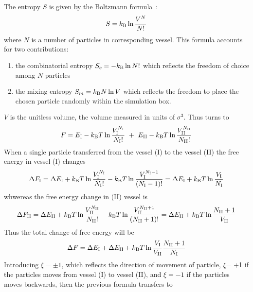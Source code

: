 \documentclass{elsarticle}
\begin{document}
The entropy $S$ is given by the Boltzmann formula~\cite{Nagle2004}:
\begin{equation}
    S=k_\mathrm{B}\ln\frac{V^{N}}{N!}\label{eq:entropy}
\end{equation}
where $N$ is a number of particles in corresponding vessel.
This formula accounts for two contributions:
\begin{enumerate}
    \item the combinatorial entropy $S_{c}=-k_\mathrm{B}\ln N!$ which reflects the freedom of choice among $N$ particles
    \item the mixing entropy $S_{m}=k_\mathrm{B} N\ln V$ which reflects the freedom to place the chosen particle randomly within the simulation box. 
\end{enumerate}
$V$ is the unitless volume, \ie the volume measured in units of $\sigma^3$. 
Thus  turns to 
\begin{equation}
    F=\EI-\kT\ln\frac{\VI^{\NI}}{\NI!}\ + \ \EII-\kT\ln\frac{\VII ^{\NII}}{{\NII} !}
\label{eq: F_gibbs}
\end{equation}
When a single particle transferred from the vessel (I) to the  vessel (II) the free energy in vessel (I) changes 
\begin{equation}
\Delta F_{\mathrm{I}} = \Delta E_{\mathrm{I}}+k_\mathrm{B}T\ln\frac{V_{\mathrm{I}}^{N_{\mathrm{I}}}}{N_{\mathrm{I}} !} - k_\mathrm{B}T\ln\frac{V_{\mathrm{I}}^{N_{\mathrm{I}}-1}}{(N_{\mathrm{I}}-1)!}=\Delta E_{\mathrm{I}} + k_\mathrm{B}T\ln\frac{V_{\mathrm{I}}}{N_{\mathrm{I}}}
\end{equation}
whwereas the free energy change in (II) vessel is
\begin{equation}
\Delta F_{\mathrm{II}} = \Delta E_{\mathrm{II}}+k_\mathrm{B}T\ln\frac{V_{\mathrm{II}}^{N_{\mathrm{II}}}}{N_{\mathrm{II}} !} - k_\mathrm{B}T\ln\frac{V_{\mathrm{II}}^{N_{\mathrm{II}}+1}}{(N_{\mathrm{II}}+1)!}=\Delta E_{\mathrm{II}} + k_\mathrm{B}T\ln\frac{N_{\mathrm{II}}+1}{V_{\mathrm{II}}}
\end{equation}
Thus the total change of free energy will be 
\begin{equation}
\Delta F = \Delta E_{\mathrm{I}}+\Delta E_{\mathrm{II}}+k_\mathrm{B}T\ln\frac{V_{\mathrm{I}}}{V_{\mathrm{II}}}\frac{N_{\mathrm{II}}+1}{N_{\mathrm{I}}}
\end{equation}
Introducing $\xi=\pm 1$, which reflects the direction of movement of particle, $\xi$= +1 if the particles moves from vessel (I) to vessel (II), and $\xi=-1$ if the particles moves backwards, then the previous formula transfers to 
\end{document}
